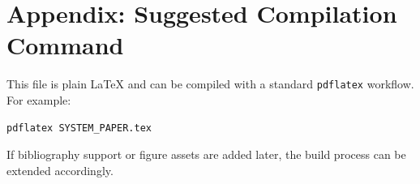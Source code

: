 \documentclass[11pt]{article}
\begin{document}
\section{Appendix: Suggested Compilation Command}
This file is plain LaTeX and can be compiled with a standard \texttt{pdflatex} workflow. For example:
\begin{verbatim}
pdflatex SYSTEM_PAPER.tex
\end{verbatim}

If bibliography support or figure assets are added later, the build process can be extended accordingly.
\end{document}
